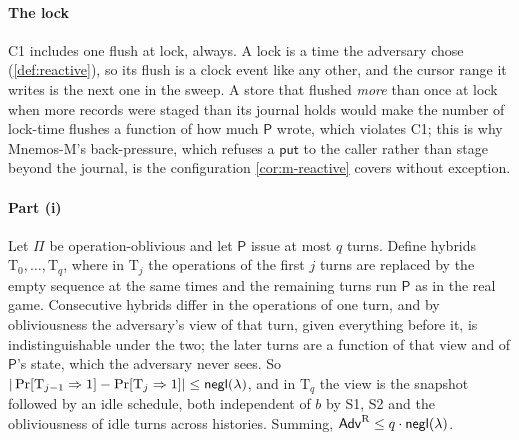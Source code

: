 \paragraph{The lock} C1 includes one flush at lock, always. A lock is a time the adversary chose
(\cref{def:reactive}), so its flush is a clock event like any other, and the cursor range it writes
is the next one in the sweep. A store that flushed \emph{more} than once at lock when more records
were staged than its journal holds would make the number of lock-time flushes a function of how much
$\mathsf{P}$ wrote, which violates C1; this is why Mnemos-M's back-pressure, which refuses a
$\mathsf{put}$ to the caller rather than stage beyond the journal, is the configuration
\cref{cor:m-reactive} covers without exception.

\paragraph{Part (i)} Let $\Pi$ be operation-oblivious and let $\mathsf{P}$ issue at most $q$ turns.
Define hybrids $\mathrm{T}_0,\dots,\mathrm{T}_q$, where in $\mathrm{T}_j$ the operations of the
first $j$ turns are replaced by the empty sequence at the same times and the remaining turns run
$\mathsf{P}$ as in the real game. Consecutive hybrids differ in the operations of one turn, and by
obliviousness the adversary's view of that turn, given everything before it, is indistinguishable
under the two; the later turns are a function of that view and of $\mathsf{P}$'s state, which the
adversary never sees. So $|\Pr[\mathrm{T}_{j-1}\Rightarrow 1] - \Pr[\mathrm{T}_j\Rightarrow 1]| \le
\mathsf{negl}(\lambda)$, and in $\mathrm{T}_q$ the view is the snapshot followed by an idle schedule, both
independent of $b$ by S1, S2 and the obliviousness of idle turns across histories. Summing, $\mathsf{Adv}^{\mathrm{R}}
\le q\cdot\mathsf{negl}(\lambda)$.

